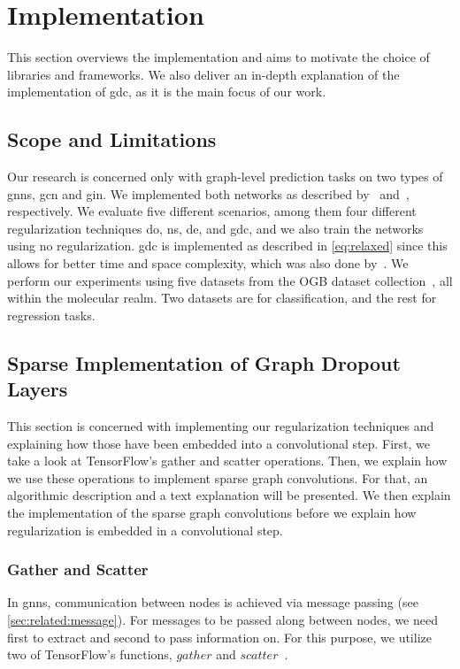 \chapter{Implementation}
\label{sec:implement}
This section overviews the implementation and aims to motivate the choice of libraries and frameworks.
We also deliver an in-depth explanation of the implementation of \ac{gdc}, as it is the main focus of our work.
\section{Scope and Limitations}
\label{sec:implement:scope}
Our research is concerned only with graph-level prediction tasks on two types of \acp{gnn}, \ac{gcn} and \ac{gin}.
We implemented both networks as described by~\citet{Kipf2017} and~\citet{Xu2019}, respectively.
We evaluate five different scenarios, among them four different regularization techniques \ac{do}, \ac{ns}, \ac{de}, and \ac{gdc}, and we also train the networks using no regularization.
\Ac{gdc} is implemented as described in \cref{eq:relaxed} since this allows for better time and space complexity, which was also done by~\citet{Hasanzadeh2020}.
We perform our experiments using five datasets from the OGB dataset collection~\cite{Hu2020}, all within the molecular realm.
Two datasets are for classification, and the rest for regression tasks.

\section{Sparse Implementation of Graph Dropout Layers}
This section is concerned with implementing our regularization techniques and explaining how those have been embedded into a convolutional step.
First, we take a look at TensorFlow's gather and scatter operations.
Then, we explain how we use these operations to implement sparse graph convolutions.
For that, an algorithmic description and a text explanation will be presented.
We then explain the implementation of the sparse graph convolutions before we explain how regularization is embedded in a convolutional step.
\label{sec:implement:gnndropout}
\subsection{Gather and Scatter}
\label{sec:implement:gnndropout:gatherscatter}
In \acp{gnn}, communication between nodes is achieved via message passing (see \cref{sec:related:message}).
For messages to be passed along between nodes, we need first to extract and second to pass information on.
For this purpose, we utilize two of TensorFlow's functions, $\mathit{gather}$ and $\mathit{scatter}$~\cite{He2007,Damke2020}.

